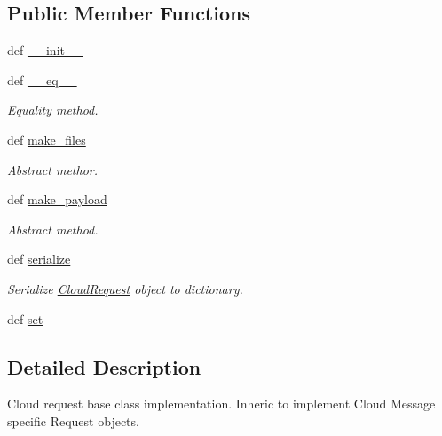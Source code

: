 \subsection*{Public Member Functions}
\begin{DoxyCompactItemize}
\item 
def \hyperlink{classRappCloud_1_1CloudMsgs_1_1Cloud_1_1CloudRequest_a1bafd853be60d165cb440f1cfec65c2b}{\-\_\-\-\_\-init\-\_\-\-\_\-}
\item 
def \hyperlink{classRappCloud_1_1CloudMsgs_1_1Cloud_1_1CloudRequest_aa46c08726ccdf32fa7c831eaac5eac32}{\-\_\-\-\_\-eq\-\_\-\-\_\-}
\begin{DoxyCompactList}\small\item\em Equality method. \end{DoxyCompactList}\item 
def \hyperlink{classRappCloud_1_1CloudMsgs_1_1Cloud_1_1CloudRequest_ac8f6e564099bef2eba81554df4615406}{make\-\_\-files}
\begin{DoxyCompactList}\small\item\em Abstract methor. \end{DoxyCompactList}\item 
def \hyperlink{classRappCloud_1_1CloudMsgs_1_1Cloud_1_1CloudRequest_ad57c90679a83b976c6ebde8a77e34f93}{make\-\_\-payload}
\begin{DoxyCompactList}\small\item\em Abstract method. \end{DoxyCompactList}\item 
def \hyperlink{classRappCloud_1_1CloudMsgs_1_1Cloud_1_1CloudRequest_a9c3e73a18896de975a1e3b93d09b162b}{serialize}
\begin{DoxyCompactList}\small\item\em Serialize \hyperlink{classRappCloud_1_1CloudMsgs_1_1Cloud_1_1CloudRequest}{Cloud\-Request} object to dictionary. \end{DoxyCompactList}\item 
def \hyperlink{classRappCloud_1_1CloudMsgs_1_1Cloud_1_1CloudRequest_a81e80cfa544efe75bcfa587f9afa7b99}{set}
\end{DoxyCompactItemize}


\subsection{Detailed Description}
\begin{DoxyVerb}Cloud request base class implementation. Inheric to implement
Cloud Message specific Request objects.
\end{DoxyVerb}
 

